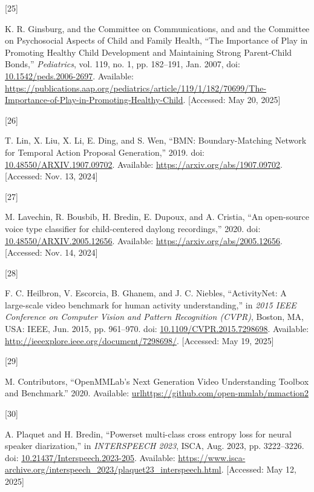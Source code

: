 \documentclass[
  man,floatsintext]{apa6}
\newlength{\cslhangindent}
\newlength{\csllabelwidth}
\newenvironment{CSLReferences}[2] %
 {\begin{list}{}{%
  \setlength{\itemindent}{0pt}
  \setlength{\leftmargin}{0pt}
  \setlength{\parsep}{0pt}
  \ifodd #1
   \setlength{\leftmargin}{\cslhangindent}
   \setlength{\itemindent}{-1\cslhangindent}
  \fi
  \setlength{\itemsep}{#2\baselineskip}}}
 {\end{list}}
\newcommand{\CSLLeftMargin}[1]{\parbox[t]{\csllabelwidth}{\strut#1\strut}}
\newcommand{\CSLRightInline}[1]{\parbox[t]{\linewidth - \csllabelwidth}{\strut#1\strut}}
\begin{document}
\begin{CSLReferences}{0}{0}
\CSLLeftMargin{{[}25{]} }%
\CSLRightInline{K. R. Ginsburg, and the Committee on Communications, and and the Committee on Psychosocial Aspects of Child and Family Health, {``The {Importance} of {Play} in {Promoting Healthy Child Development} and {Maintaining Strong Parent-Child Bonds},''} \emph{Pediatrics}, vol. 119, no. 1, pp. 182--191, Jan. 2007, doi: \href{https://doi.org/10.1542/peds.2006-2697}{10.1542/peds.2006-2697}. Available: \url{https://publications.aap.org/pediatrics/article/119/1/182/70699/The-Importance-of-Play-in-Promoting-Healthy-Child}. {[}Accessed: May 20, 2025{]}}

\CSLLeftMargin{{[}26{]} }%
\CSLRightInline{T. Lin, X. Liu, X. Li, E. Ding, and S. Wen, {``{BMN}: {Boundary-Matching Network} for {Temporal Action Proposal Generation},''} 2019. doi: \href{https://doi.org/10.48550/ARXIV.1907.09702}{10.48550/ARXIV.1907.09702}. Available: \url{https://arxiv.org/abs/1907.09702}. {[}Accessed: Nov. 13, 2024{]}}

\CSLLeftMargin{{[}27{]} }%
\CSLRightInline{M. Lavechin, R. Bousbib, H. Bredin, E. Dupoux, and A. Cristia, {``An open-source voice type classifier for child-centered daylong recordings,''} 2020. doi: \href{https://doi.org/10.48550/ARXIV.2005.12656}{10.48550/ARXIV.2005.12656}. Available: \url{https://arxiv.org/abs/2005.12656}. {[}Accessed: Nov. 14, 2024{]}}

\CSLLeftMargin{{[}28{]} }%
\CSLRightInline{F. C. Heilbron, V. Escorcia, B. Ghanem, and J. C. Niebles, {``{ActivityNet}: {A} large-scale video benchmark for human activity understanding,''} in \emph{2015 {IEEE Conference} on {Computer Vision} and {Pattern Recognition} ({CVPR})}, Boston, MA, USA: IEEE, Jun. 2015, pp. 961--970. doi: \href{https://doi.org/10.1109/CVPR.2015.7298698}{10.1109/CVPR.2015.7298698}. Available: \url{http://ieeexplore.ieee.org/document/7298698/}. {[}Accessed: May 19, 2025{]}}

\CSLLeftMargin{{[}29{]} }%
\CSLRightInline{M. Contributors, {``{OpenMMLab}'s {Next Generation Video Understanding Toolbox} and {Benchmark}.''} 2020. Available: \url{urlhttps://github.com/open-mmlab/mmaction2}}

\CSLLeftMargin{{[}30{]} }%
\CSLRightInline{A. Plaquet and H. Bredin, {``Powerset multi-class cross entropy loss for neural speaker diarization,''} in \emph{{INTERSPEECH} 2023}, ISCA, Aug. 2023, pp. 3222--3226. doi: \href{https://doi.org/10.21437/Interspeech.2023-205}{10.21437/Interspeech.2023-205}. Available: \url{https://www.isca-archive.org/interspeech_2023/plaquet23_interspeech.html}. {[}Accessed: May 12, 2025{]}}


\end{CSLReferences}
\end{document}
